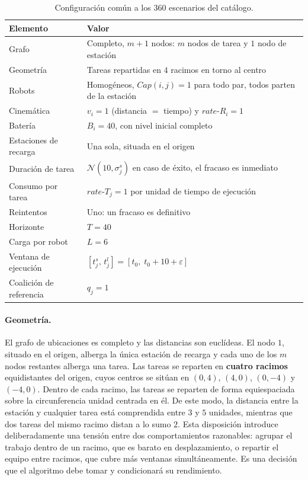 \begin{table}[t]
\centering
\caption{Configuración común a los 360 escenarios del catálogo.}
\label{tab:sustrato}
\begin{tabular}{ll}
\hline
\textbf{Elemento} & \textbf{Valor} \\
\hline
Grafo                   & Completo, $m+1$ nodos: $m$ nodos de tarea y $1$ nodo de estación \\
Geometría               & Tareas repartidas en $4$ racimos en torno al centro \\
Robots                  & Homogéneos, $\textit{Cap}(i,j)=1$ para todo par, todos parten de la estación \\
Cinemática              & $v_i=1$ (distancia $=$ tiempo) y $\textit{rate-}R_i=1$ \\
Batería                 & $B_i=40$, con nivel inicial completo \\
Estaciones de recarga   & Una sola, situada en el origen \\
Duración de tarea       & $\mathcal{N}(10,\sigma_j^{s})$ en caso de éxito, el fracaso es inmediato \\
Consumo por tarea       & $\textit{rate-}T_j=1$ por unidad de tiempo de ejecución  \\
Reintentos              & Uno: un fracaso es definitivo \\
Horizonte               & $T=40$ \\
Carga por robot         & $L=6$ \\
Ventana de ejecución   & $[t_j^{s},\,t_j^{l}]=[t_0,\;t_0+10+\varepsilon]$ \\
Coalición de referencia & $q_j=1$ \\
\hline
\end{tabular}
\end{table}

\paragraph{Geometría.} El grafo de ubicaciones es completo y las distancias son euclídeas. El nodo $1$, situado en el origen, alberga la única estación de recarga y cada uno de los $m$ nodos restantes alberga una tarea. Las tareas se reparten en \textbf{cuatro racimos} equidistantes del origen, cuyos centros se sitúan en $(0,4)$, $(4,0)$, $(0,-4)$ y $(-4,0)$. Dentro de cada racimo, las tareas se reparten de forma equiespaciada sobre la circunferencia unidad centrada en él. De este modo, la distancia entre la estación y cualquier tarea está comprendida entre $3$ y $5$ unidades, mientras que dos tareas del mismo racimo distan a lo sumo $2$. Esta disposición introduce deliberadamente una tensión entre dos comportamientos razonables: agrupar el trabajo dentro de un racimo, que es barato en desplazamiento, o repartir el equipo entre racimos, que cubre más ventanas simultáneamente. Es una decisión que el algoritmo debe tomar y condicionará su rendimiento.

